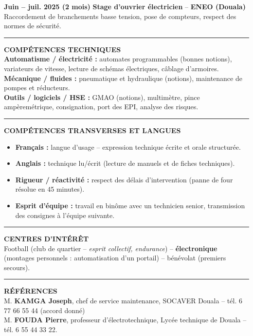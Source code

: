 \documentclass[11pt]{article}
\begin{document}
\begin{exemplebox}
\textbf{Juin -- juil. 2025 (2 mois)} \hfill \textbf{Stage d'ouvrier électricien} -- \textbf{ENEO (Douala)} \\
Raccordement de branchements basse tension, pose de compteurs, respect des normes de sécurité.
\rule{\linewidth}{0.5pt}
\textbf{COMPÉTENCES TECHNIQUES} \\
\textbf{Automatisme / électricité :} automates programmables (bonnes notions), variateurs de vitesse, lecture de schémas électriques, câblage d'armoires. \\
\textbf{Mécanique / fluides :} pneumatique et hydraulique (notions), maintenance de pompes et réducteurs. \\
\textbf{Outils / logiciels / HSE :} GMAO (notions), multimètre, pince ampèremétrique, consignation, port des EPI, analyse des risques.
\rule{\linewidth}{0.5pt}
\textbf{COMPÉTENCES TRANSVERSES ET LANGUES} \\
\begin{itemize}
    \item \textbf{Français :} langue d'usage -- expression technique écrite et orale structurée.
    \item \textbf{Anglais :} technique lu/écrit (lecture de manuels et de fiches techniques).
    \item \textbf{Rigueur / réactivité :} respect des délais d'intervention (panne de four résolue en 45 minutes).
    \item \textbf{Esprit d'équipe :} travail en binôme avec un technicien senior, transmission des consignes à l'équipe suivante.
\end{itemize}
\rule{\linewidth}{0.5pt}
\textbf{CENTRES D'INTÉRÊT} \\
Football (club de quartier -- \emph{esprit collectif, endurance}) -- \textbf{électronique} (montages personnels : automatisation d'un portail) -- bénévolat (premiers secours).
\rule{\linewidth}{0.5pt}
\textbf{RÉFÉRENCES} \\
M. \textbf{KAMGA Joseph}, chef de service maintenance, SOCAVER Douala -- tél. 6 77 66 55 44 (accord donné) \\
M. \textbf{FOUDA Pierre}, professeur d'électrotechnique, Lycée technique de Douala -- tél. 6 55 44 33 22.
\end{exemplebox}
\end{document}
